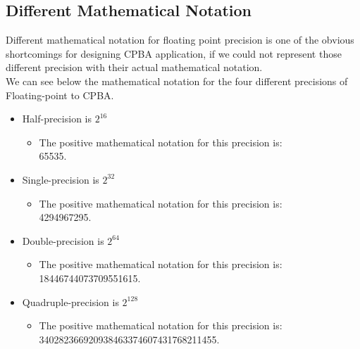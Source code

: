 \documentclass[11pt]{article}
\begin{document}
\subsection{Different Mathematical Notation}%
Different mathematical notation for floating point precision is one of the obvious shortcomings for designing CPBA application, if we could not represent those different precision with their actual mathematical notation.\\%
We can see below the mathematical notation for the four different precisions of Floating-point to CPBA.\\
\begin{itemize}
\item{Half-precision is $2^{16}$}
\begin{itemize}\item[]{The positive mathematical notation for this precision is:\\65535.}\end{itemize}%
\item{Single-precision is $2^{32}$}
\begin{itemize}\item[]{The positive mathematical notation for this precision is:\\4294967295.}\end{itemize}%
\item{Double-precision is $2^{64}$}
\begin{itemize}\item[]{The positive mathematical notation for this precision is:\\18446744073709551615.}\end{itemize}%
\item{Quadruple-precision is $2^{128}$}
\begin{itemize}\item[]{The positive mathematical notation for this precision is:\\340282366920938463374607431768211455.}\end{itemize}%
\end{itemize}
\end{document}

